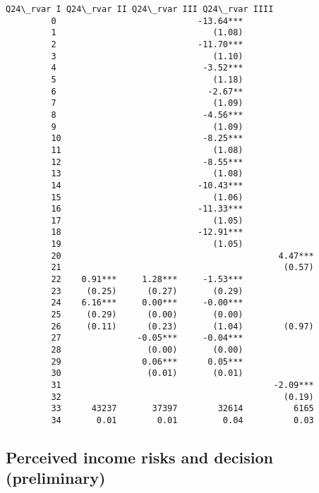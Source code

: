\documentclass[12pt,notitlepage,onecolumn,aps,pra]{revtex4-1}
\begin{document}
\begin{Verbatim}[commandchars=\\\{\}]
            Q24\_rvar I Q24\_rvar II Q24\_rvar III Q24\_rvar IIII  
         0                            -13.64***                
         1                               (1.08)                
         2                            -11.70***                
         3                               (1.10)                
         4                             -3.52***                
         5                               (1.18)                
         6                              -2.67**                
         7                               (1.09)                
         8                             -4.56***                
         9                               (1.09)                
         10                            -8.25***                
         11                              (1.08)                
         12                            -8.55***                
         13                              (1.08)                
         14                           -10.43***                
         15                              (1.06)                
         16                           -11.33***                
         17                              (1.05)                
         18                           -12.91***                
         19                              (1.05)                
         20                                           4.47***  
         21                                            (0.57)  
         22    0.91***     1.28***     -1.53***                
         23     (0.25)      (0.27)       (0.29)                
         24    6.16***     0.00***     -0.00***                
         25     (0.29)      (0.00)       (0.00)                
         26     (0.11)      (0.23)       (1.04)        (0.97)  
         27               -0.05***     -0.04***                
         28                 (0.00)       (0.00)                
         29                0.06***      0.05***                
         30                 (0.01)       (0.01)                
         31                                          -2.09***  
         32                                            (0.19)  
         33      43237       37397        32614          6165  
         34       0.01        0.01         0.04          0.03  
\end{Verbatim}
            
    \hypertarget{perceived-income-risks-and-decision-preliminary}{%
\subsection{Perceived income risks and decision
(preliminary)}\label{perceived-income-risks-and-decision-preliminary}}
\end{document}

